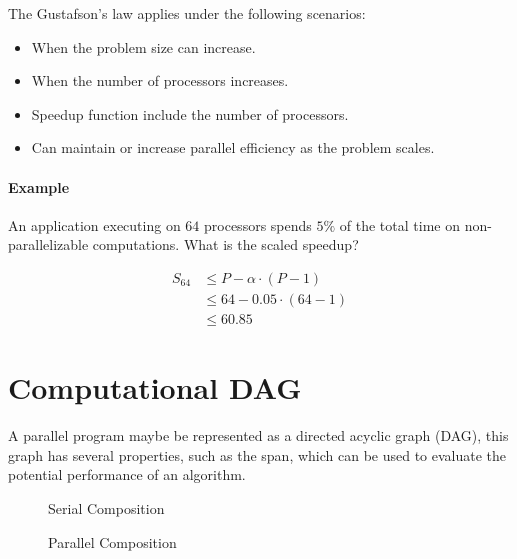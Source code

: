The Gustafson’s law applies under the following scenarios:
\begin{itemize}
    \item When the problem size can increase.
    \item When the number of processors increases.
    \item Speedup function include the number of processors.
    \item Can maintain or increase parallel efficiency as the problem scales.
\end{itemize}

\paragraph{Example} An application executing on $64$ processors spends $5\%$ of the total time on non-parallelizable computations.
What is the scaled speedup?

\begin{equation}
    \begin{split}
        S_64 & \le P - \alpha \cdot (P-1)\\
             & \le 64 - 0.05 \cdot (64 - 1)\\
             & \le 60.85
    \end{split}
\end{equation}

\section{Computational DAG}

A parallel program maybe be represented as a directed acyclic graph (DAG),
this graph has several properties, such as the span,
which can be used to evaluate the potential performance of an algorithm.

\begin{figure}
    \centering
    \caption{Serial Composition}
    \label{fig:dag:serial}
\end{figure}


\begin{figure}
    \centering
    \caption{Parallel Composition}
    \label{fig:dag:parallel}
\end{figure}

